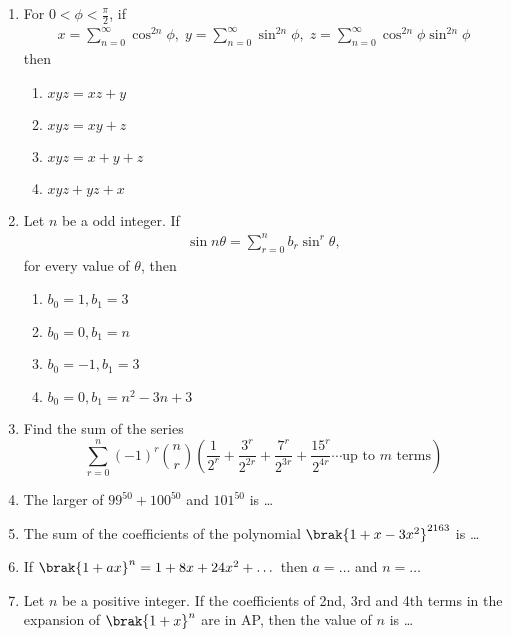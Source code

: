 \begin{enumerate}[label=\thesubsection.\arabic*,ref=\thesubsection.\theenumi]
%
\item For $0 < \phi < \frac{\pi}{2}$,  if 
\begin{align*}
x=\sum_{n=0}^{\infty} \cos^{2n} \phi ,  \; 
y=\sum_{n=0}^{\infty} \sin^{2n} \phi ,  \; 
z=\sum_{n=0}^{\infty} \cos^{2n} \phi \sin^{2n} \phi
\end{align*}
then \hfill{}
\begin{multicols}{2}
\begin{enumerate}    
\item $xyz=xz+y$
\item $xyz=xy+z$
\item $xyz=x+y+z$
\item $xyz+yz+x$
\end{enumerate}
\end{multicols}
\item Let $n$ be a odd integer. If 
\begin{align*}
\sin n\theta= \sum_{r=0}^{n} b_r \sin^{r} \theta,  
\end{align*}
for every value of $\theta$,  then
\hfill{}
\begin{multicols}{2}
\begin{enumerate}    
\item $b_0=1,  b_1=3$
\item $b_0=0,  b_1=n$
\item $b_0=-1,  b_1=3$
\item $b_0=0,  b_1=n^2-3n+3$
\end{enumerate}
\end{multicols}
	\item Find the sum of the series 
	    \hfill {}
		\[
\sum_{r=0}^{n} (-1)^r \binom{n}{r} \left( \frac{1}{2^r} + \frac{3^r}{2^{2r}} + \frac{7^r}{2^{3r}} + \frac{15^r}{2^{4r}}  \cdots \text{up to $m$ terms} \right)
\]
%	    
%
\item The larger of $99^{50}+100^{50}$ and $101^{50}$ is \dots \hfill {}
\item The sum of the coefficients of the polynomial $\brak{1+x-3x^2}^{2163}$ is \dots \hfill {}
\item If $\brak{1+ax}^n=1+8x+24x^2+\dots$ then $a=\dots$ and $n=\dots$
	\hfill {}
\item Let $n$ be  a positive integer. If the coefficients of 2nd, 3rd and 4th terms in the expansion of $\brak{1 + x}^n$ are in  AP, then the value of $n$ is \dots	\hfill {}

\end{enumerate}

